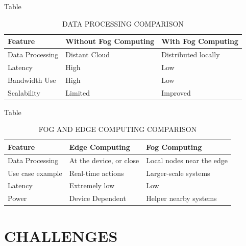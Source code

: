 \documentclass[aspectratio=169,xcolor=dvipsnames]{beamer}
\begin{document}
\begin{frame}{Table}
    \begin{table}
        \begin{tabular}{l l l}
            \toprule
            \textbf{Feature} & \textbf{Without Fog Computing } & \textbf{With Fog Computing} \\
            \midrule
            Data Processing         & Distant Cloud           & Distributed locally               \\
            Latency         & High           & Low               \\
            Bandwidth Use         & High           & Low               \\
            Scalability         & Limited           & Improved               \\
            \bottomrule
        \end{tabular}
        \caption{DATA PROCESSING COMPARISON}
    \end{table}
\end{frame}

\begin{frame}{Table}
    \begin{table}
        \begin{tabular}{l l l}
            \toprule
            \textbf{Feature} & \textbf{Edge Computing } & \textbf{Fog Computing} \\
            \midrule
            Data Processing         & At the device, or close           & Local nodes near the edge               \\
            Use case example         & Real-time actions           & Larger-scale systems               \\
            Latency        & Extremely low           & Low               \\
            Power         & Device Dependent           & Helper nearby systems               \\
            \bottomrule
        \end{tabular}
        \caption{FOG AND EDGE COMPUTING COMPARISON}
    \end{table}
\end{frame}

\section{CHALLENGES}
\end{document}
